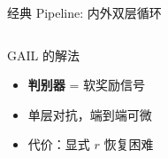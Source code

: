 \documentclass[aspectratio=169, 11pt]{beamer}
\newcommand{\gd}[1]{\textcolor{good}{\textbf{#1}}}
\begin{document}
\begin{frame}{经典 Pipeline: 内外双层循环}
\begin{columns}[T]
    \footnotesize
    \begin{exampleblock}{GAIL 的解法}
      \begin{itemize}\setlength\itemsep{2pt}
        \item \gd{判别器} = 软奖励信号
        \item 单层对抗，端到端可微
        \item 代价：显式 $r$ 恢复困难
      \end{itemize}
    \end{exampleblock}
  \end{columns}

\end{frame}
\end{document}
